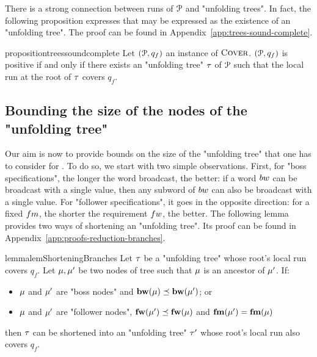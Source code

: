 \begin{example}
\end{example}


There is a strong connection between runs of $\mathcal{P}$ and "unfolding trees". In fact, the following proposition expresses that \COVER may be expressed as the existence of an "unfolding tree". 
The proof can be found in Appendix~\ref{app:trees-sound-complete}.


\begin{restatable}{proposition}{treessoundcomplete}
\label{prop:trees-sound-complete}
Let $(\mathcal{P},q_f)$ an instance of $\textsc{Cover}$. $(\mathcal{P},q_f)$ is positive if and only if there exists an "unfolding tree" $\tau$ of $\mathcal{P}$ such that the local run at the root of $\tau$ covers $q_f$.
\end{restatable}



\subsection{Bounding the size of the nodes of the "unfolding tree"}
\label{sec:local-bounds}

Our aim is now to provide bounds on the size of the "unfolding tree" that one has to consider for \COVER. To do so, we start with two simple observations. First, for "boss specifications", the longer the word broadcast, the better: if a word $\bossspec$ can be broadcast with a single value, then any subword of $\bossspec$ can also be broadcast with a single value. 
For "follower specifications", it goes in the opposite direction: for a fixed $\followmessagespec$, the shorter the requirement $\followwordspec$, the better. The following lemma provides two ways of shortening an "unfolding tree". Its proof can be found in Appendix~\ref{app:proofs-reduction-branches}.

\begin{restatable}{lemma}{lemShorteningBranches} 
\label{lem:shortening-branches}
	Let $\tau$ be a "unfolding tree" whose root's local run covers $q_f$.
	Let $\mu, \mu'$ be two nodes of tree such that $\mu$ is an ancestor of $\mu'$. If:
	\begin{itemize}
	\item $\mu$ and $\mu'$ are "boss nodes" and $\mathbf{bw}(\mu) \preceq \mathbf{bw}(\mu')$; or
	\item $\mu$ and $\mu'$ are "follower nodes", $\mathbf{fw}(\mu') \preceq \mathbf{fw}(\mu)$ and $\mathbf{fm}(\mu')=\mathbf{fm}(\mu)$
	\end{itemize}

	then $\tau$ can be shortened into an "unfolding tree" $\tau'$ whose root's local run also covers $q_f$. 
\end{restatable}

